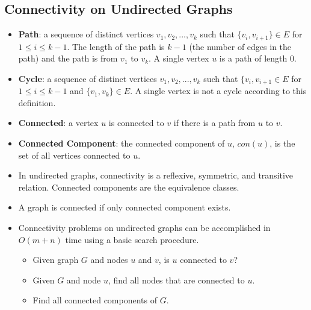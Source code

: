 \documentclass[12pt]{article}
\begin{document}
\subsection{Connectivity on Undirected Graphs}
\begin{itemize}
    \item \textbf{Path}: a sequence of distinct vertices $v_1, v_2, ..., v_k$ such that $\{ v_i, v_{i + 1} \} \in E$ for $1 \leq i \leq k - 1$. The length of the path is $k - 1$ (the number of edges in the path) and the path is from $v_1$ to $v_k$. A single vertex $u$ is a path of length $0$.
    \item \textbf{Cycle}: a sequence of distinct vertices $v_1, v_2, ..., v_k$ such that $\{ v_i, v_{i + 1} \in E$ for $1 \leq i \leq k - 1$ and $\{ v_1, v_k \} \in E$. A single vertex is not a cycle according to this definition.
    \item \textbf{Connected}: a vertex $u$ is connected to $v$ if there is a path from $u$ to $v$.
    \item \textbf{Connected Component}: the connected component of $u$, $con(u)$, is the set of all vertices connected to $u$.
    \item In undirected graphs, connectivity is a reflexive, symmetric, and transitive relation. Connected components are the equivalence classes.
    \item A graph is connected if only connected component exists.
    \item Connectivity problems on undirected graphs can be accomplished in $O(m + n)$ time using a basic search procedure.
    \begin{itemize}
        \item Given graph $G$ and nodes $u$ and $v$, is $u$ connected to $v$?
        \item Given $G$ and node $u$, find all nodes that are connected to $u$.
        \item Find all connected components of $G$.
    \end{itemize}
\end{itemize}
\end{document}
